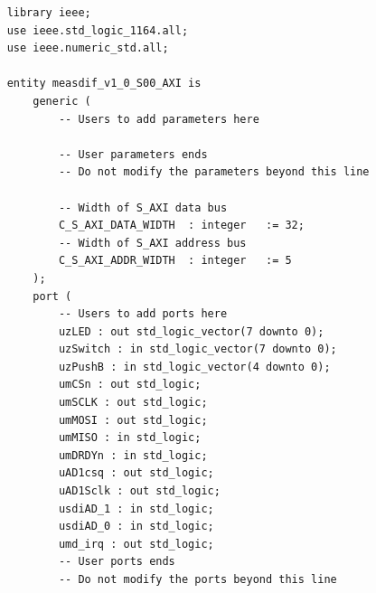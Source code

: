 \begin{verbatim}
    library ieee;
    use ieee.std_logic_1164.all;
    use ieee.numeric_std.all;
    
    entity measdif_v1_0_S00_AXI is
        generic (
            -- Users to add parameters here
    
            -- User parameters ends
            -- Do not modify the parameters beyond this line
    
            -- Width of S_AXI data bus
            C_S_AXI_DATA_WIDTH	: integer	:= 32;
            -- Width of S_AXI address bus
            C_S_AXI_ADDR_WIDTH	: integer	:= 5
        );
        port (
            -- Users to add ports here
            uzLED : out std_logic_vector(7 downto 0);
            uzSwitch : in std_logic_vector(7 downto 0);
            uzPushB : in std_logic_vector(4 downto 0);
            umCSn : out std_logic;
            umSCLK : out std_logic;
            umMOSI : out std_logic;
            umMISO : in std_logic;
            umDRDYn : in std_logic;
            uAD1csq : out std_logic;
            uAD1Sclk : out std_logic;
            usdiAD_1 : in std_logic;
            usdiAD_0 : in std_logic;
            umd_irq : out std_logic;
            -- User ports ends
            -- Do not modify the ports beyond this line
    

\end{verbatim}
